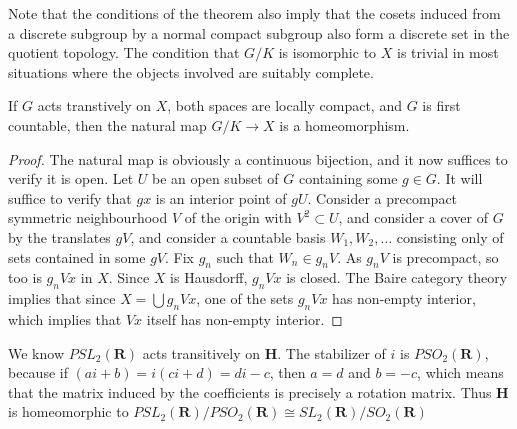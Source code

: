 Note that the conditions of the theorem also imply that the cosets induced from a discrete subgroup by a normal compact subgroup also form a discrete set in the quotient topology. The condition that $G/K$ is isomorphic to $X$ is trivial in most situations where the objects involved are suitably complete.

\begin{theorem}
    If $G$ acts transtively on $X$, both spaces are locally compact, and $G$ is first countable, then the natural map $G/K \to X$ is a homeomorphism.
\end{theorem}
\begin{proof}
    The natural map is obviously a continuous bijection, and it now suffices to verify it is open. Let $U$ be an open subset of $G$ containing some $g \in G$. It will suffice to verify that $gx$ is an interior point of $gU$. Consider a precompact symmetric neighbourhood $V$ of the origin with $V^2 \subset U$, and consider a cover of $G$ by the translates $gV$, and consider a countable basis $W_1, W_2, \dots$ consisting only of sets contained in some $gV$. Fix $g_n$ such that $W_n \in g_nV$. As $g_n V$ is precompact, so too is $g_n Vx$ in $X$. Since $X$ is Hausdorff, $g_n Vx$ is closed. The Baire category theory implies that since $X = \bigcup g_n Vx$, one of the sets $g_n Vx$ has non-empty interior, which implies that $Vx$ itself has non-empty interior.
\end{proof}

\begin{example}
    We know $PSL_2(\mathbf{R})$ acts transitively on $\mathbf{H}$. The stabilizer of $i$ is $PSO_2(\mathbf{R})$, because if $(ai + b) = i(ci + d) = di - c$, then $a = d$ and $b = -c$, which means that the matrix induced by the coefficients is precisely a rotation matrix. Thus $\mathbf{H}$ is homeomorphic to $PSL_2(\mathbf{R})/PSO_2(\mathbf{R}) \cong SL_2(\mathbf{R})/SO_2(\mathbf{R})$
\end{example}

